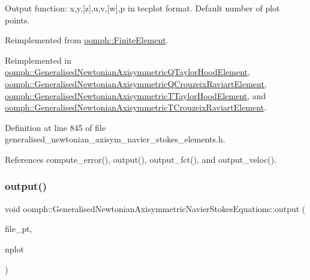 Output function\+: x,y,\mbox{[}z\mbox{]},u,v,\mbox{[}w\mbox{]},p in tecplot format. Default number of plot points. 



Reimplemented from \hyperlink{classoomph_1_1FiniteElement_a72cddd09f8ddbee1a20a1ff404c6943e}{oomph\+::\+Finite\+Element}.



Reimplemented in \hyperlink{classoomph_1_1GeneralisedNewtonianAxisymmetricQTaylorHoodElement_aa1cdcb0e344c3f3745e9fb9ad0fe3e33}{oomph\+::\+Generalised\+Newtonian\+Axisymmetric\+Q\+Taylor\+Hood\+Element}, \hyperlink{classoomph_1_1GeneralisedNewtonianAxisymmetricQCrouzeixRaviartElement_aa35348f142e702e3590bc28d5001d492}{oomph\+::\+Generalised\+Newtonian\+Axisymmetric\+Q\+Crouzeix\+Raviart\+Element}, \hyperlink{classoomph_1_1GeneralisedNewtonianAxisymmetricTTaylorHoodElement_aedc97079cc4048b5467c5010f53ebc07}{oomph\+::\+Generalised\+Newtonian\+Axisymmetric\+T\+Taylor\+Hood\+Element}, and \hyperlink{classoomph_1_1GeneralisedNewtonianAxisymmetricTCrouzeixRaviartElement_a8f3ca9d5dfb8d259e26fca5bef65fab2}{oomph\+::\+Generalised\+Newtonian\+Axisymmetric\+T\+Crouzeix\+Raviart\+Element}.



Definition at line 845 of file generalised\+\_\+newtonian\+\_\+axisym\+\_\+navier\+\_\+stokes\+\_\+elements.\+h.



References compute\+\_\+error(), output(), output\+\_\+fct(), and output\+\_\+veloc().

\mbox{\label{classoomph_1_1GeneralisedNewtonianAxisymmetricNavierStokesEquations_a9aae32c881c1c55c2d20c579bf5438f7}} 
\subsubsection{\texorpdfstring{output()}{output()}\hspace{0.1cm}{\footnotesize\ttfamily [4/4]}}
{\footnotesize\ttfamily void oomph\+::\+Generalised\+Newtonian\+Axisymmetric\+Navier\+Stokes\+Equations\+::output (\begin{DoxyParamCaption}\item[{F\+I\+LE $\ast$}]{file\+\_\+pt,  }\item[{const unsigned \&}]{nplot }\end{DoxyParamCaption})\hspace{0.3cm}{\ttfamily [virtual]}}




